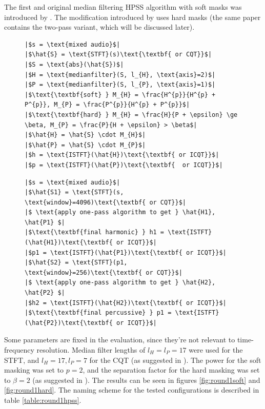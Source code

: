 \documentclass[letter,12pt]{article}
\newlength{\mintednumbersep}
\begin{document}
The first and original median filtering HPSS algorithm with soft masks was introduced by \citet{fitzgerald1}. The modification introduced by \citet{driedger} uses hard masks (the same paper contains the two-pass variant, which will be discussed later).

\begin{figure}[h]
  \centering
 \begin{minipage}{0.48\textwidth}
  \centering
\begin{verbatim}
|$s = \text{mixed audio}$|
|$\hat{S} = \text{STFT}(s)\text{\textbf{ or CQT}}$|
|$S = \text{abs}(\hat{S})$|
|$H = \text{medianfilter}(S, l_{H}, \text{axis}=2)$|
|$P = \text{medianfilter}(S, l_{P}, \text{axis}=1)$|
|$\text{\textbf{soft} } M_{H} = \frac{H^{p}}{H^{p} + P^{p}}, M_{P} = \frac{P^{p}}{H^{p} + P^{p}}$|
|$\text{\textbf{hard} } M_{H} = \frac{H}{P + \epsilon} \ge \beta, M_{P} = \frac{P}{H + \epsilon} > \beta$|
|$\hat{H} = \hat{S} \cdot M_{H}$|
|$\hat{P} = \hat{S} \cdot M_{P}$|
|$h = \text{ISTFT}(\hat{H})\text{\textbf{ or ICQT}}$|
|$p = \text{ISTFT}(\hat{P})\text{\textbf{  or ICQT}}$|
\end{verbatim}
 \end{minipage}
\hspace{0.02\textwidth}
 \begin{minipage}{0.48\textwidth}
  \centering
\begin{verbatim}
|$s = \text{mixed audio}$|
|$\hat{S1} = \text{STFT}(s, \text{window}=4096)\text{\textbf{ or CQT}}$|
|$ \text{apply one-pass algorithm to get } \hat{H1}, \hat{P1} $|
|$\text{\textbf{final harmonic} } h1 = \text{ISTFT}(\hat{H1})\text{\textbf{ or ICQT}}$|
|$p1 = \text{ISTFT}(\hat{P1})\text{\textbf{ or ICQT}}$|
|$\hat{S2} = \text{STFT}(p1, \text{window}=256)\text{\textbf{ or CQT}}$|
|$ \text{apply one-pass algorithm to get } \hat{H2}, \hat{P2} $|
|$h2 = \text{ISTFT}(\hat{H2})\text{\textbf{ or ICQT}}$|
|$\text{\textbf{final percussive} } p1 = \text{ISTFT}(\hat{P2})\text{\textbf{ or ICQT}}$|
\end{verbatim}
 \end{minipage}
  \label{lst:pseudocodes}
\end{figure}

Some parameters are fixed in the evaluation, since they're not relevant to time-frequency resolution. Median filter lengths of $l_{H} = l_{P} = 17$ were used for the STFT, and $l_{H} = 17, l_{P} = 7$ for the CQT (as suggested in \cite{fitzgerald1, fitzgerald2}). The power for the soft masking was set to $p = 2$, and the separation factor for the hard masking was set to $\beta = 2$ (as suggested in \cite{fitzgerald1, driedger}). The results can be seen in figures \ref{fig:round1soft} and \ref{fig:round1hard}. The naming scheme for the tested configurations is described in table \ref{table:round1hpss}.
\end{document}
